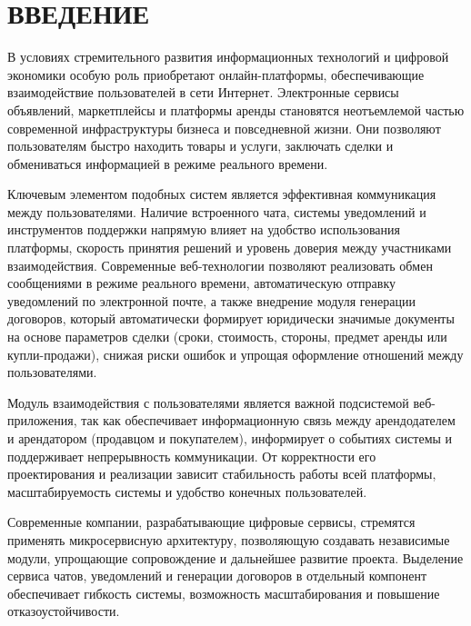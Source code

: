 \section*{ВВЕДЕНИЕ}

В условиях стремительного развития информационных технологий и цифровой экономики особую роль приобретают онлайн-платформы, обеспечивающие взаимодействие пользователей в сети Интернет. Электронные сервисы объявлений, маркетплейсы и платформы аренды становятся неотъемлемой частью современной инфраструктуры бизнеса и повседневной жизни. Они позволяют пользователям быстро находить товары и услуги, заключать сделки и обмениваться информацией в режиме реального времени.

Ключевым элементом подобных систем является эффективная коммуникация между пользователями. Наличие встроенного чата, системы уведомлений и инструментов поддержки напрямую влияет на удобство использования платформы, скорость принятия решений и уровень доверия между участниками взаимодействия. Современные веб-технологии позволяют реализовать обмен сообщениями в режиме реального времени, автоматическую отправку уведомлений по электронной почте, а также внедрение модуля генерации договоров, который автоматически формирует юридически значимые документы на основе параметров сделки (сроки, стоимость, стороны, предмет аренды или купли-продажи), снижая риски ошибок и упрощая оформление отношений между пользователями.

Модуль взаимодействия с пользователями является важной подсистемой веб-приложения, так как обеспечивает информационную связь между арендодателем и арендатором (продавцом и покупателем), информирует о событиях системы и поддерживает непрерывность коммуникации. От корректности его проектирования и реализации зависит стабильность работы всей платформы, масштабируемость системы и удобство конечных пользователей.

Современные компании, разрабатывающие цифровые сервисы, стремятся применять микросервисную архитектуру, позволяющую создавать независимые модули, упрощающие сопровождение и дальнейшее развитие проекта. Выделение сервиса чатов, уведомлений и генерации договоров в отдельный компонент обеспечивает гибкость системы, возможность масштабирования и повышение отказоустойчивости.

